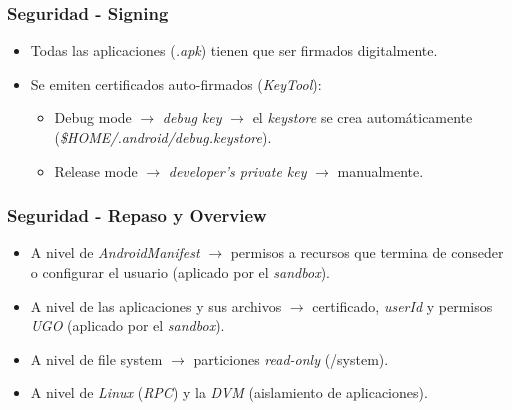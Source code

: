 \begin{frame}
  \frametitle{Seguridad - Signing}
  \begin{itemize}
    \item Todas las aplicaciones (\textit{.apk}) tienen que ser firmados digitalmente.

    \item Se emiten certificados auto-firmados (\textit{KeyTool}):
    \begin{itemize}
  \item Debug mode $\rightarrow$ \textit{debug key} $\rightarrow$ el \textit{keystore} se crea automáticamente (\textit{\$HOME/.android/debug.keystore}).
  
  \item Release mode $\rightarrow$ \textit{developer's private key} $\rightarrow$ manualmente.
    \end{itemize}    
  \end{itemize}
\end{frame}

\begin{frame}
  \frametitle{Seguridad - Repaso y Overview}
  \begin{itemize}
   \item A nivel de \textit{AndroidManifest} $\rightarrow$ permisos a recursos que termina de conseder o configurar el usuario (aplicado por el \textit{sandbox}).
   
   \item A nivel de las aplicaciones y sus archivos $\rightarrow$ certificado, \textit{userId} y permisos \textit{UGO} (aplicado por el \textit{sandbox}).
   
   \item A nivel de file system $\rightarrow$ particiones \textit{read-only} (/system).
   
   \item A nivel de \textit{Linux} (\textit{RPC}) y la \textit{DVM} (aislamiento de aplicaciones).
  \end{itemize}
\end{frame}

